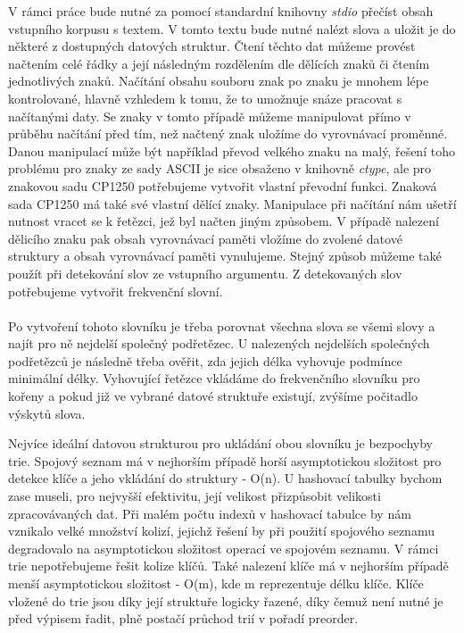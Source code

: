 ﻿\documentclass[12pt, a4paper]{article}
\begin{document}
V rámci práce bude nutné za pomocí standardní knihovny \textit{stdio} přečíst obsah vstupního korpusu s textem. V tomto textu bude nutné nalézt slova a uložit je do některé z dostupných datových struktur. Čtení těchto dat můžeme provést načtením celé řádky a její následným rozdělením dle dělících znaků či čtením jednotlivých znaků. Načítání obsahu souboru znak po znaku je mnohem lépe kontrolované, hlavně vzhledem k tomu, že to umožnuje snáze pracovat s načítanými daty. Se znaky v tomto případě můžeme manipulovat přímo v průběhu načítání před tím, než načtený znak uložíme do vyrovnávací proměnné. Danou manipulací může být například převod velkého znaku na malý, řešení toho problému pro znaky ze sady ASCII je sice obsaženo v knihovně \textit{ctype}, ale pro znakovou sadu CP1250 potřebujeme vytvořit vlastní převodní funkci. Znaková sada CP1250 má také své vlastní dělící znaky. Manipulace při načítání nám ušetří nutnost vracet se k řetězci, jež byl načten jiným způsobem. V případě nalezení dělicího znaku pak obsah vyrovnávací paměti vložíme do zvolené datové struktury a obsah vyrovnávací paměti vynulujeme. Stejný způsob můžeme také použít při detekování slov ze vstupního argumentu. Z detekovaných slov potřebujeme vytvořit frekvenční slovní.

\paragraph{}
Po vytvoření tohoto slovníku je třeba porovnat všechna slova se všemi slovy a najít pro ně nejdelší společný podřetězec. U nalezených nejdelších společných podřetězců je následně třeba ověřit, zda jejich délka vyhovuje podmínce minimální délky. Vyhovující řetězce vkládáme do frekvenčního slovníku pro kořeny a pokud již ve vybrané datové struktuře existují, zvýšíme počitadlo výskytů slova. 

Nejvíce ideální datovou strukturou pro ukládání obou slovníku je bezpochyby trie. Spojový seznam má v nejhorším případě horší asymptotickou složitost pro detekce klíče a jeho vkládání do struktury - O(n). U hashovací tabulky bychom zase museli, pro nejvyšší efektivitu, její velikost přizpůsobit velikosti zpracovávaných dat. Při malém počtu indexů v  hashovací tabulce by nám vznikalo velké množství kolizí, jejichž řešení by při použití spojového seznamu degradovalo na asymptotickou složitost operací ve spojovém seznamu. V rámci trie nepotřebujeme řešit kolize klíčů. Také nalezení klíče má v nejhorším případě menší asymptotickou složitost - O(m), kde m reprezentuje délku klíče. Klíče vložené do trie jsou díky její struktuře logicky řazené, díky čemuž není nutné je před výpisem řadit, plně postačí průchod trií v pořadí preorder.
\end{document}
